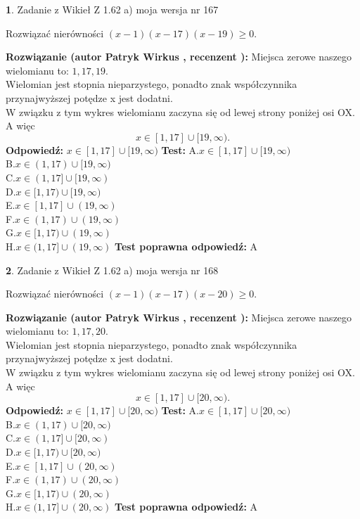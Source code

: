\documentclass[12pt, a4paper]{article}
\theoremstyle{definition} %
\newtheorem{zad}{}
\newcommand{\zadStart}[1]{\begin{zad}#1\newline}
\newcommand{\zadStop}{\end{zad}}
\newcommand{\rozwStart}[2]{\noindent \textbf{Rozwiązanie (autor #1 , recenzent #2): }\newline}
\newcommand{\rozwStop}{\newline}
\newcommand{\odpStart}{\noindent \textbf{Odpowiedź:}\newline}
\newcommand{\odpStop}{\newline}
\newcommand{\testStart}{\noindent \textbf{Test:}\newline}
\newcommand{\testStop}{\newline}
\newcommand{\kluczStart}{\noindent \textbf{Test poprawna odpowiedź:}\newline}
\newcommand{\kluczStop}{\newline}
\begin{document}
\zadStart{Zadanie z Wikieł Z 1.62 a) moja wersja nr 167}

Rozwiązać nierówności $(x-1)(x-17)(x-19)\ge0$.
\zadStop
\rozwStart{Patryk Wirkus}{}
Miejsca zerowe naszego wielomianu to: $1, 17, 19$.\\
Wielomian jest stopnia nieparzystego, ponadto znak współczynnika przy\linebreak najwyższej potędze x jest dodatni.\\ W związku z tym wykres wielomianu zaczyna się od lewej strony poniżej osi OX. A więc $$x \in [1,17] \cup [19,\infty).$$
\rozwStop
\odpStart
$x \in [1,17] \cup [19,\infty)$
\odpStop
\testStart
A.$x \in [1,17] \cup [19,\infty)$\\
B.$x \in (1,17) \cup [19,\infty)$\\
C.$x \in (1,17] \cup [19,\infty)$\\
D.$x \in [1,17) \cup [19,\infty)$\\
E.$x \in [1,17] \cup (19,\infty)$\\
F.$x \in (1,17) \cup (19,\infty)$\\
G.$x \in [1,17) \cup (19,\infty)$\\
H.$x \in (1,17] \cup (19,\infty)$
\testStop
\kluczStart
A
\kluczStop



\zadStart{Zadanie z Wikieł Z 1.62 a) moja wersja nr 168}

Rozwiązać nierówności $(x-1)(x-17)(x-20)\ge0$.
\zadStop
\rozwStart{Patryk Wirkus}{}
Miejsca zerowe naszego wielomianu to: $1, 17, 20$.\\
Wielomian jest stopnia nieparzystego, ponadto znak współczynnika przy\linebreak najwyższej potędze x jest dodatni.\\ W związku z tym wykres wielomianu zaczyna się od lewej strony poniżej osi OX. A więc $$x \in [1,17] \cup [20,\infty).$$
\rozwStop
\odpStart
$x \in [1,17] \cup [20,\infty)$
\odpStop
\testStart
A.$x \in [1,17] \cup [20,\infty)$\\
B.$x \in (1,17) \cup [20,\infty)$\\
C.$x \in (1,17] \cup [20,\infty)$\\
D.$x \in [1,17) \cup [20,\infty)$\\
E.$x \in [1,17] \cup (20,\infty)$\\
F.$x \in (1,17) \cup (20,\infty)$\\
G.$x \in [1,17) \cup (20,\infty)$\\
H.$x \in (1,17] \cup (20,\infty)$
\testStop
\kluczStart
A
\kluczStop
\end{document}
